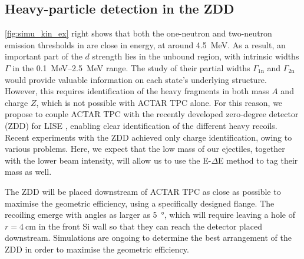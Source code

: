 \documentclass[a4paper, 10pt]{article}
\newcommand{\iso}[2]{\ce{^{#1}#2}}
\begin{document}
\subsection{Heavy-particle detection in the ZDD}

\autoref{fig:simu_kin_ex} right shows that both the one-neutron and two-neutron emission thresholds in \iso{18}{C} are close in energy, at around \qty{4.5}{\MeV}. As a result, an important part of the $d$ strength lies in the unbound region, with intrinsic widths $\Gamma$ in the \qtyrange{0.1}{2.5}{\MeV} range. The study of their partial widths $\Gamma_{\text{1n}}$ and $\Gamma_{\text{2n}}$ would provide valuable information on each state's underlying structure. However, this requires identification of the heavy fragments in both mass $A$ and charge $Z$, which is not possible with ACTAR TPC alone. For this reason, we propose to couple ACTAR TPC with the recently developed zero-degree detector (ZDD) for LISE \cite{girard-alcindor2023}, enabling clear identification of the different heavy recoils. Recent experiments with the ZDD achieved only charge identification, owing to various problems. Here, we expect that the low mass of our ejectiles, together with the lower beam intensity, will allow us to use the E-$\Delta$E method to tag their mass as well.

The ZDD will be placed downstream of ACTAR TPC as close as possible to maximise the geometric efficiency, using a specifically designed flange. The recoiling \iso{18}{C} emerge with angles as larger as \qty{5}{\degree}, which will require leaving a hole of $r = \qty{4}{\cm}$ in the front Si wall so that they can reach the detector placed downstream. Simulations are ongoing to determine the best arrangement of the ZDD in order to maximise the geometric efficiency.

\end{document}
